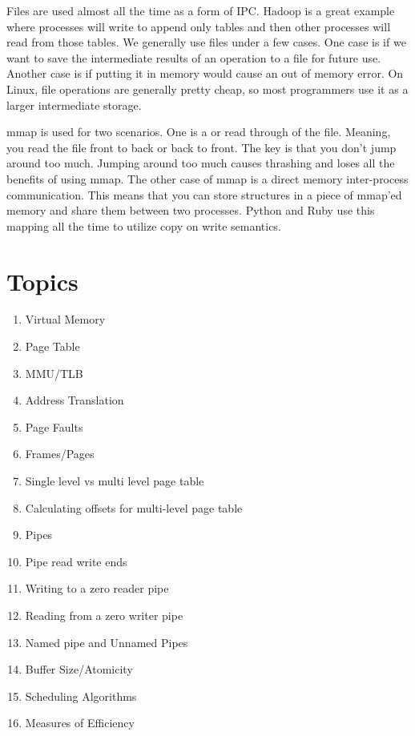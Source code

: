 Files are used almost all the time as a form of IPC.
Hadoop is a great example where processes will write to append only tables and then other processes will read from those tables.
We generally use files under a few cases.
One case is if we want to save the intermediate results of an operation to a file for future use.
Another case is if putting it in memory would cause an out of memory error.
On Linux, file operations are generally pretty cheap, so most programmers use it as a larger intermediate storage.

mmap is used for two scenarios.
One is a  or  read through of the file.
Meaning, you read the file front to back or back to front.
The key is that you don't jump around too much.
Jumping around too much causes thrashing and loses all the benefits of using mmap.
The other case of mmap is a direct memory inter-process communication.
This means that you can store structures in a piece of mmap'ed memory and share them between two processes.
Python and Ruby use this mapping all the time to utilize copy on write semantics.

\section{Topics}

\begin{enumerate}
  \item Virtual Memory
  \item Page Table
  \item MMU/TLB
  \item Address Translation
  \item Page Faults
  \item Frames/Pages
  \item Single level vs multi level page table
  \item Calculating offsets for multi-level page table
  \item Pipes
  \item Pipe read write ends
  \item Writing to a zero reader pipe
  \item Reading from a zero writer pipe
  \item Named pipe and Unnamed Pipes
  \item Buffer Size/Atomicity
  \item Scheduling Algorithms
  \item Measures of Efficiency
\end{enumerate}

